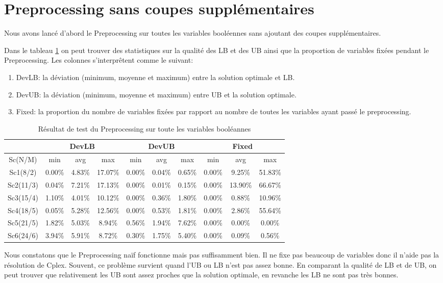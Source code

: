\documentclass[twoside,fleqn]{EPURapport}
\begin{document}
\section{Preprocessing sans coupes supplémentaires}
Nous avons lancé d'abord le Preprocessing sur toutes les variables booléennes sans ajoutant des coupes supplémentaires.

Dans le tableau \ref{tab_pre} on peut trouver des statistiques sur la qualité des LB et des UB ainsi que la proportion de variables fixées pendant le Preprocessing. Les colonnes s'interprêtent comme le suivant:
\begin{enumerate}
	\item DevLB: la déviation (minimum, moyenne et maximum) entre la solution optimale et LB.
	\item DevUB: la déviation (minimum, moyenne et maximum) entre UB et la solution optimale.
	\item Fixed: la proportion du nombre de variables fixées par rapport au nombre de toutes les variables ayant passé le preprocessing.
\end{enumerate}

\bigskip
\begin{table}[h]
    \centering
    \begin{tabular}{|c|c|c|c|c|c|c|c|c|c|}
    	\hline 
    	&\multicolumn{3}{c|}{DevLB}& \multicolumn{3}{c|}{DevUB}& \multicolumn{3}{c|}{Fixed} 	\\ \hline
    	Sc(N/M)	& min & avg & max & min & avg & max & min & avg & max\\ \hline
Sc1(8/2) & 0.00\%  &4.83\%  &17.07\%  &0.00\% & 0.04\%  &0.65\%  &0.00\%  &9.25\% &51.83\% \\ \hline
Sc2(11/3)&  0.04\% & 7.21\% & 17.13\% & 0.00\%&  0.01\% & 0.15\% & 0.00\% &13.90\% & 66.67\%\\ \hline
Sc3(15/4)&  1.10\% & 4.01\% & 10.12\% & 0.00\%&  0.36\% & 1.80\% & 0.00\% &0.88\% & 10.96\%\\ \hline
Sc4(18/5)&  0.05\% & 5.28\% & 12.56\% & 0.00\%&  0.53\% & 1.81\% & 0.00\% &2.86\% & 55.64\%\\ \hline
Sc5(21/5)&  1.82\% & 5.03\% & 8.94\%  &0.56\% & 1.94\%  &7.62\%  &0.00\%  &0.00\% &0.00\%\\ \hline
Sc6(24/6)&  3.94\% & 5.91\% & 8.72\%  &0.30\% & 1.75\%  &5.40\%  &0.00\%  &0.09\% &0.56\%\\ \hline
    \end{tabular}
    \caption{Résultat de test du Preprocessing sur toute les variables booléannes}
    \label{tab_pre}
\end{table}
\bigskip
Nous constatons que le Preprocessing naïf fonctionne mais pas suffisamment bien. Il ne fixe pas beaucoup de variables donc il n'aide pas la résolution de Cplex. Souvent, ce problème survient quand l'UB ou LB n'est pas assez bonne. En comparant la qualité de LB et de UB, on peut trouver que relativement les UB sont assez proches que la solution optimale, en revanche les LB ne sont pas très bonnes.
\end{document}
